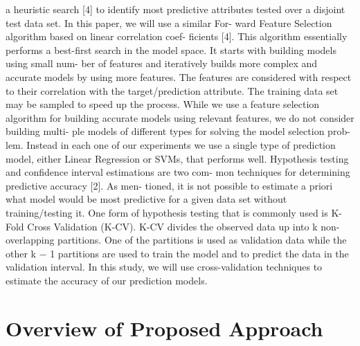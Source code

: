 \documentclass{article}
\begin{document}
\begin{multicols}{2}
	a heuristic search [4] to identify most predictive attributes tested
	over a disjoint test data set. In this paper, we will use a similar For-
	ward Feature Selection algorithm based on linear correlation coef-
	ficients [4]. This algorithm essentially performs a best-first search
	in the model space. It starts with building models using small num-
	ber of features and iteratively builds more complex and accurate
	models by using more features. The features are considered with
	respect to their correlation with the target/prediction attribute. The
	training data set may be sampled to speed up the process.
	While we use a feature selection algorithm for building accurate
	models using relevant features, we do not consider building multi-
	ple models of different types for solving the model selection prob-
	lem. Instead in each one of our experiments we use a single type of
	prediction model, either Linear Regression or SVMs, that performs
	well.
	Hypothesis testing and confidence interval estimations are two com-
	mon techniques for determining predictive accuracy [2]. As men-
	tioned, it is not possible to estimate a priori what model would be
	most predictive for a given data set without training/testing it. One
	form of hypothesis testing that is commonly used is K-Fold Cross
	Validation (K-CV). K-CV divides the observed data up into k non-
	overlapping partitions. One of the partitions is used as validation
	data while the other k − 1 partitions are used to train the model
	and to predict the data in the validation interval. In this study, we
	will use cross-validation techniques to estimate the accuracy of our
	prediction models.

	\section{Overview of Proposed Approach}
	

\end{multicols}
\end{document}
